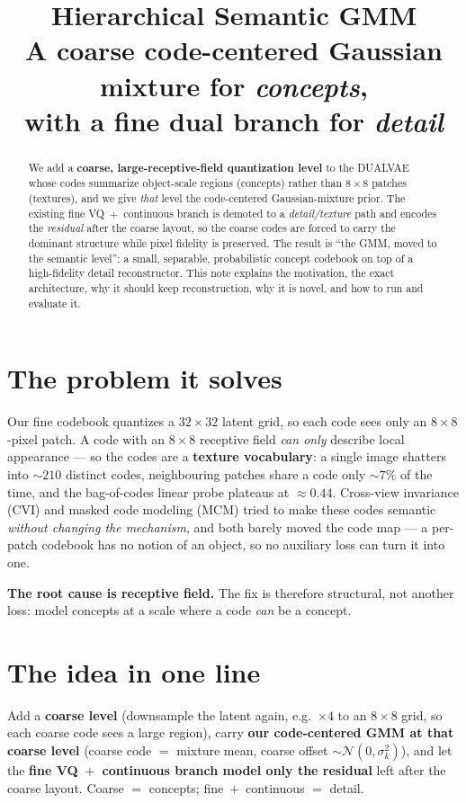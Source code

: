 \documentclass[11pt]{article}
\title{\textbf{Hierarchical Semantic GMM}\\[3pt]
\large A coarse code-centered Gaussian mixture for \emph{concepts},\\ with a fine dual branch for \emph{detail}}
\date{}
\begin{document}
\maketitle
\vspace{-2.5em}

\begin{abstract}
\noindent We add a \textbf{coarse, large-receptive-field quantization level} to the DUALVAE whose
codes summarize object-scale regions (concepts) rather than $8{\times}8$ patches (textures), and we
give \emph{that} level the code-centered Gaussian-mixture prior. The existing fine VQ~$+$~continuous
branch is demoted to a \emph{detail/texture} path and encodes the \emph{residual} after the coarse
layout, so the coarse codes are forced to carry the dominant structure while pixel fidelity is
preserved. The result is ``the GMM, moved to the semantic level'': a small, separable, probabilistic
concept codebook on top of a high-fidelity detail reconstructor. This note explains the motivation,
the exact architecture, why it should keep reconstruction, why it is novel, and how to run and
evaluate it.
\end{abstract}

\section{The problem it solves}
Our fine codebook quantizes a $32{\times}32$ latent grid, so each code sees only an $8{\times}8$-pixel
patch. A code with an $8{\times}8$ receptive field \emph{can only} describe local appearance --- so the
codes are a \textbf{texture vocabulary}: a single image shatters into $\sim$$210$ distinct codes,
neighbouring patches share a code only $\sim$$7\%$ of the time, and the bag-of-codes linear probe
plateaus at $\approx0.44$. Cross-view invariance (CVI) and masked code modeling (MCM) tried to make
these codes semantic \emph{without changing the mechanism}, and both barely moved the code map --- a
per-patch codebook has no notion of an object, so no auxiliary loss can turn it into one.

\textbf{The root cause is receptive field.} The fix is therefore structural, not another loss:
model concepts at a scale where a code \emph{can} be a concept.

\section{The idea in one line}
Add a \textbf{coarse level} (downsample the latent again, e.g.\ $\times4$ to an $8{\times}8$ grid, so
each coarse code sees a large region), carry \textbf{our code-centered GMM at that coarse level}
(coarse code $=$ mixture mean, coarse offset $\sim\mathcal{N}(0,\sigma_k^2)$), and let the \textbf{fine
VQ~$+$~continuous branch model only the residual} left after the coarse layout. Coarse $=$ concepts;
fine~$+$~continuous $=$ detail.
\end{document}
